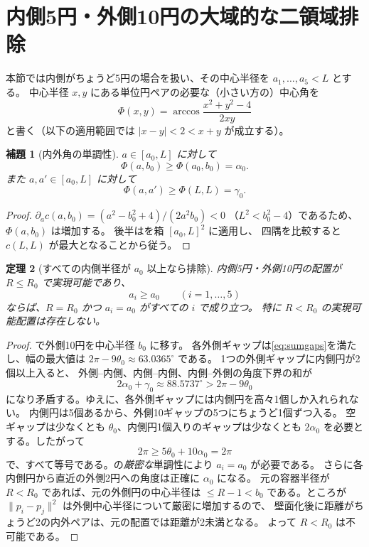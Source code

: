 \documentclass[11pt,a4paper]{article}
\theoremstyle{JPthm}
\newtheorem{theorem}{定理}[section]
\newtheorem{lemma}[theorem]{補題}
\theoremstyle{definition}
\newcommand{\Rc}{R_{0}}
\newcommand{\thzero}{\theta_{0}}
\newcommand{\azero}{a_{0}}
\newcommand{\bzero}{b_{0}}
\begin{document}
\section{内側5円・外側10円の大域的な二領域排除}
本節では内側がちょうど5円の場合を扱い、その中心半径を $a_1,\ldots,a_5<L$ とする。
中心半径 $x,y$ にある単位円ペアの必要な（小さい方の）中心角を
\begin{equation}\label{eq:angle}
 \Phi(x,y)=\arccos\frac{x^2+y^2-4}{2xy}
\end{equation}
と書く（以下の適用範囲では $|x-y|<2<x+y$ が成立する）。
\begin{lemma}[内外角の単調性]\label{lem:alphamon}
$a\in[\azero,L]$ に対して
\[
 \Phi(a,\bzero)\ge\Phi(\azero,\bzero)=\alpha_0.
\]
また $a,a'\in[\azero,L]$ に対して
\[
 \Phi(a,a')\ge\Phi(L,L)=\gamma_0.
\]
\end{lemma}
\begin{proof}
$\partial_a c(a,\bzero)=(a^2-\bzero^2+4)/(2a^2\bzero)<0$
（$L^2<\bzero^2-4$）であるため、$\Phi(a,\bzero)$ は増加する。
後半はを箱 $[\azero,L]^2$ に適用し、
四隅を比較すると $c(L,L)$ が最大となることから従う。
\end{proof}
\begin{theorem}[すべての内側半径が $\azero$ 以上なら排除]\label{thm:high}
内側5円・外側10円の配置が $R\le\Rc$ で実現可能であり、
\[
 a_i\ge\azero\qquad(i=1,\ldots,5)
\]
ならば、$R=\Rc$ かつ $a_i=\azero$ がすべての $i$ で成り立つ。
特に $R<\Rc$ の実現可能配置は存在しない。
\end{theorem}
\begin{proof}
で外側10円を中心半径 $\bzero$ に移す。
各外側ギャップは\eqref{eq:sumgaps}を満たし、幅の最大値は
$2\pi-9\thzero\approx63.0365^\circ$ である。
1つの外側ギャップに内側円が2個以上入ると、
外側--内側、内側--内側、内側--外側の角度下界の和が
\[
2\alpha_0+\gamma_0\approx88.5737^\circ
>2\pi-9\thzero
\]
になり矛盾する。ゆえに、各外側ギャップには内側円を高々1個しか入れられない。
内側円は5個あるから、外側10ギャップの5つにちょうど1個ずつ入る。
空ギャップは少なくとも $\thzero$、内側円1個入りのギャップは少なくとも
$2\alpha_0$ を必要とする。したがって
\[
 2\pi\ge 5\thzero+10\alpha_0
 =2\pi
\]
で、すべて等号である。の\emph{厳密な}単調性により
$a_i=\azero$ が必要である。
さらに各内側円から直近の外側2円への角度は正確に $\alpha_0$ になる。
元の容器半径が $R<\Rc$ であれば、元の外側円の中心半径は
$\le R-1<\bzero$ である。ところが
$\|p_i-p_j\|^2$ は外側中心半径について厳密に増加するので、
壁面化後に距離がちょうど2の内外ペアは、元の配置では距離が2未満となる。
よって $R<\Rc$ は不可能である。
\end{proof}
\end{document}
